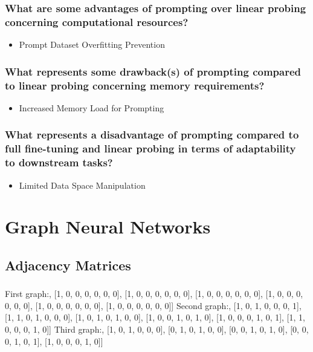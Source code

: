 \documentclass[a4paper]{article}
\begin{document}
\subsubsection{What are some advantages of prompting over linear probing concerning computational resources?}
\begin{itemize}
    \item Prompt Dataset Overfitting Prevention
\end{itemize}

\subsubsection{What represents some drawback(s) of prompting compared to linear probing concerning memory requirements?}
\begin{itemize}
    \item Increased Memory Load for Prompting
\end{itemize}

\subsubsection{What represents a disadvantage of prompting compared to full fine-tuning and linear probing in terms of adaptability to downstream tasks?}
\begin{itemize}
    \item Limited Data Space Manipulation
\end{itemize}


\section{Graph Neural Networks}
\subsection{Adjacency Matrices}
\subsubsection{}
First graph:\newline
[[0, 1, 1, 1, 1, 1, 1], [1, 0, 0, 0, 0, 0, 0], [1, 0, 0, 0, 0, 0, 0], [1, 0, 0, 0, 0, 0, 0], [1, 0, 0, 0, 0, 0, 0], [1, 0, 0, 0, 0, 0, 0], [1, 0, 0, 0, 0, 0, 0]]\newline\newline
Second graph:\newline
[[0, 1, 1, 1, 1, 1, 1], [1, 0, 1, 0, 0, 0, 1], [1, 1, 0, 1, 0, 0, 0], [1, 0, 1, 0, 1, 0, 0], [1, 0, 0, 1, 0, 1, 0], [1, 0, 0, 0, 1, 0, 1], [1, 1, 0, 0, 0, 1, 0]]\newline\newline
Third graph:\newline
[[0, 1, 0, 0, 0, 1], [1, 0, 1, 0, 0, 0], [0, 1, 0, 1, 0, 0], [0, 0, 1, 0, 1, 0], [0, 0, 0, 1, 0, 1], [1, 0, 0, 0, 1, 0]]
\end{document}
